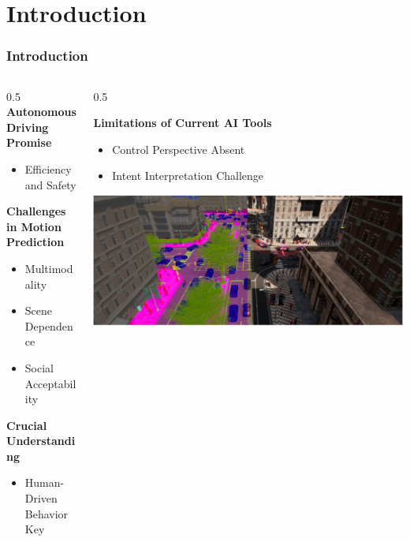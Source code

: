 \section{Introduction}

\begin{frame}
  \frametitle{Introduction}

   \begin{columns}[c]
       \begin{column}{0.5\hsize}
            \textbf{Autonomous Driving Promise}
            \begin{itemize}[]
                \item Efficiency and Safety
            \end{itemize}

            \hfil

            \textbf{Challenges in Motion Prediction}
            
            \begin{itemize}[]
                \item Multimodality
                \item Scene Dependence
                \item Social Acceptability
            \end{itemize}

            \textbf{Crucial Understanding}
            \begin{itemize}[]
                \item Human-Driven Behavior Key
            \end{itemize}


       \end{column}
       \begin{column}{0.5\hsize}
            \hfil

            \textbf{Limitations of Current AI Tools}
            \begin{itemize}[]
                \item Control Perspective Absent
                \item Intent Interpretation Challenge
            \end{itemize}


            \hfil

            \includegraphics[width= 1 \textwidth]{figures/pictures_first_part/street_rendering.jpeg}

       \end{column}
   \end{columns}
\end{frame}


